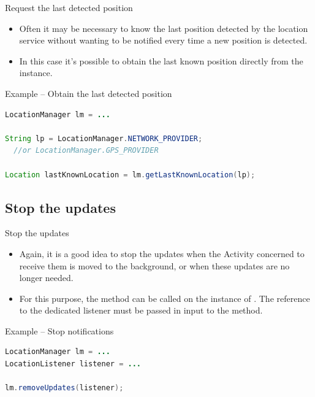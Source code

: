 \documentclass{beamer}
\begin{document}
  \begin{frame}[fragile]{Request the last detected position}
    \begin{itemize}
      \item Often it may be necessary to know the last position detected by the
      location service without wanting to be notified every time a new position is
      detected.
      \item In this case it's possible to obtain the last known position directly
      from the  instance. 
    \end{itemize}

    \begin{exampleblock}{Example -- Obtain the last detected position}
      \begin{lstlisting}[language=Java]
LocationManager lm = ...

String lp = LocationManager.NETWORK_PROVIDER;
  //or LocationManager.GPS_PROVIDER

Location lastKnownLocation = lm.getLastKnownLocation(lp);
      \end{lstlisting}
    \end{exampleblock}
  \end{frame}

\subsection*{Stop the updates}

  \begin{frame}[fragile]{Stop the updates}
    \begin{itemize}\itemsep10pt
      \item Again, it is a good idea to stop the updates when the Activity
      concerned to receive them is moved to the background, or when these
      updates are no longer needed.
      \item For this purpose, the  method can be called
      on the instance of . The reference to the dedicated
      listener must be passed in input to the method.
    \end{itemize}

    \begin{exampleblock}{Example -- Stop notifications}
      \begin{lstlisting}[language=Java]
LocationManager lm = ...
LocationListener listener = ...

lm.removeUpdates(listener);
      \end{lstlisting}
    \end{exampleblock}
  \end{frame}
\end{document}
